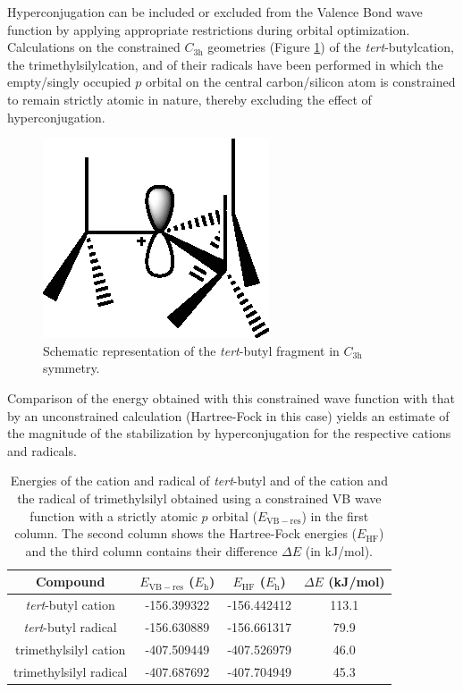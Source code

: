 Hyperconjugation can be included or excluded from the Valence Bond wave function by applying appropriate restrictions during orbital optimization.  Calculations on the constrained $C_\mathrm{3h}$ geometries (Figure \ref{ch3.fig.c3h}) of the \textit{tert}-butylcation, the trimethylsilylcation, and of their radicals have been performed in which the empty/singly occupied $p$ orbital on the central carbon/silicon atom is constrained to remain strictly atomic in nature, thereby excluding the effect of hyperconjugation.
\begin{figure}[ht]
\center
\includegraphics{dissociation/figures/c3h.eps}
\caption{Schematic representation of the \textit{tert}-butyl fragment in $C_\mathrm{3h}$ symmetry.}
\label{ch3.fig.c3h}
\end{figure}
Comparison of the energy obtained with this constrained wave function with that by an unconstrained calculation  (Hartree-Fock in this case) yields an estimate of the magnitude of the stabilization by hyperconjugation for the respective cations and radicals. 

\begin{table}[htp]
\center
\caption{Energies of the cation and radical of \textit{tert}-butyl and of the cation and the radical of trimethylsilyl obtained using a constrained VB wave function with a strictly atomic $p$ orbital ($E_\mathrm{VB-res}$) in the first column. The second column shows the Hartree-Fock energies ($E_\mathrm{HF}$) and the third column contains their difference $\Delta E$ (in kJ/mol).}
\label{ch3.tab.hyp}
\begin{tabular}{|c|c|c|c|}
\hline
\textbf{Compound} & $E_\mathrm{VB-res}$ ($E_{\mathrm{h}}$) &$E_\mathrm{HF}$ ($E_{\mathrm{h}}$)& $\Delta E$ (kJ/mol)  \\
\hline
\textit{tert}-butyl cation & -156.399322 &-156.442412&113.1  \\
\textit{tert}-butyl radical & -156.630889 &-156.661317&79.9 \\
trimethylsilyl cation & -407.509449&-407.526979&46.0 \\
trimethylsilyl radical &-407.687692&-407.704949&45.3 \\
\hline
\end{tabular}
\end{table}

